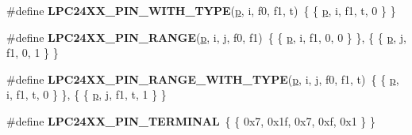 \begin{DoxyCompactItemize}
\item 
\mbox{\label{group__lpc24xx__io_ga98cdd76535ffc5e0fb4b88abfae4330f}} 
\#define {\bfseries L\+P\+C24\+X\+X\+\_\+\+P\+I\+N\+\_\+\+W\+I\+T\+H\+\_\+\+T\+Y\+PE}(\mbox{\hyperlink{sun4u_2tte_8h_a27952ffc298d15b4fc0e7ee6b2a044ac}{p}},  i,  f0,  f1,  t)~\{ \{ \mbox{\hyperlink{sun4u_2tte_8h_a27952ffc298d15b4fc0e7ee6b2a044ac}{p}}, i, f1, t, 0 \} \}
\item 
\mbox{\label{group__lpc24xx__io_gad7c872c471985a53f922ebb7b5513429}} 
\#define {\bfseries L\+P\+C24\+X\+X\+\_\+\+P\+I\+N\+\_\+\+R\+A\+N\+GE}(\mbox{\hyperlink{sun4u_2tte_8h_a27952ffc298d15b4fc0e7ee6b2a044ac}{p}},  i,  j,  f0,  f1)~\{ \{ \mbox{\hyperlink{sun4u_2tte_8h_a27952ffc298d15b4fc0e7ee6b2a044ac}{p}}, i, f1, 0, 0 \} \}, \{ \{ \mbox{\hyperlink{sun4u_2tte_8h_a27952ffc298d15b4fc0e7ee6b2a044ac}{p}}, j, f1, 0, 1 \} \}
\item 
\mbox{\label{group__lpc24xx__io_ga17f77224d7c95a15a5b335c972fc1d11}} 
\#define {\bfseries L\+P\+C24\+X\+X\+\_\+\+P\+I\+N\+\_\+\+R\+A\+N\+G\+E\+\_\+\+W\+I\+T\+H\+\_\+\+T\+Y\+PE}(\mbox{\hyperlink{sun4u_2tte_8h_a27952ffc298d15b4fc0e7ee6b2a044ac}{p}},  i,  j,  f0,  f1,  t)~\{ \{ \mbox{\hyperlink{sun4u_2tte_8h_a27952ffc298d15b4fc0e7ee6b2a044ac}{p}}, i, f1, t, 0 \} \}, \{ \{ \mbox{\hyperlink{sun4u_2tte_8h_a27952ffc298d15b4fc0e7ee6b2a044ac}{p}}, j, f1, t, 1 \} \}
\item 
\mbox{\label{group__lpc24xx__io_gaaea3ca334faa2bd054e3b59eafa7e97c}} 
\#define {\bfseries L\+P\+C24\+X\+X\+\_\+\+P\+I\+N\+\_\+\+T\+E\+R\+M\+I\+N\+AL}~\{ \{ 0x7, 0x1f, 0x7, 0xf, 0x1 \} \}
\end{DoxyCompactItemize}
